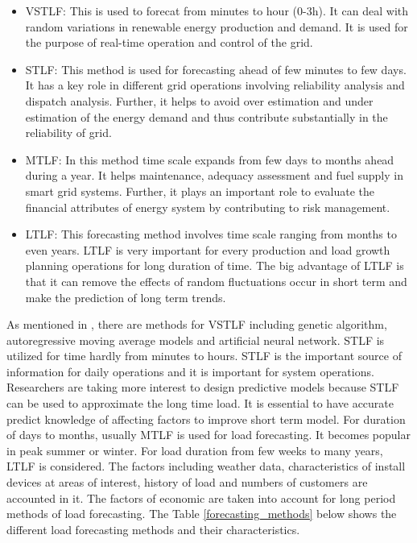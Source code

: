 \documentclass[mstat,12pt]{unswthesis}
\begin{document}
\begin{itemize}
\item
  VSTLF: This is used to forecat from minutes to hour (0-3h). It can
  deal with random variations in renewable energy production and demand.
  It is used for the purpose of real-time operation and control of the
  grid.
\item
  STLF: This method is used for forecasting ahead of few minutes to few
  days. It has a key role in different grid operations involving
  reliability analysis and dispatch analysis. Further, it helps to avoid
  over estimation and under estimation of the energy demand and thus
  contribute substantially in the reliability of grid.
\item
  MTLF: In this method time scale expands from few days to months ahead
  during a year. It helps maintenance, adequacy assessment and fuel
  supply in smart grid systems. Further, it plays an important role to
  evaluate the financial attributes of energy system by contributing to
  risk management.
\item
  LTLF: This forecasting method involves time scale ranging from months
  to even years. LTLF is very important for every production and load
  growth planning operations for long duration of time. The big
  advantage of LTLF is that it can remove the effects of random
  fluctuations occur in short term and make the prediction of long term
  trends.
\end{itemize}

As mentioned in \cite{9812604}, there are methods for VSTLF including
genetic algorithm, autoregressive moving average models and artificial
neural network. STLF is utilized for time hardly from minutes to hours.
STLF is the important source of information for daily operations and it
is important for system operations. Researchers are taking more interest
to design predictive models because STLF can be used to approximate the
long time load. It is essential to have accurate predict knowledge of
affecting factors to improve short term model. For duration of days to
months, usually MTLF is used for load forecasting. It becomes popular in
peak summer or winter. For load duration from few weeks to many years,
LTLF is considered. The factors including weather data, characteristics
of install devices at areas of interest, history of load and numbers of
customers are accounted in it. The factors of economic are taken into
account for long period methods of load forecasting. The Table
\ref{forecasting_methods} \cite{9812604} below shows the different load
forecasting methods and their characteristics.
\end{document}
